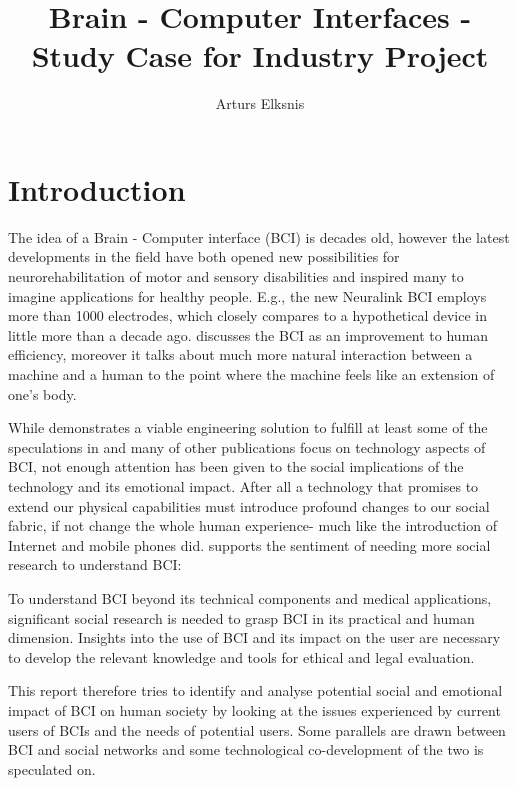 \documentclass[fleqn,11pt]{olplainarticle}
\title{Brain - Computer Interfaces - Study Case for Industry Project}
\author[1]{Arturs Elksnis}
\begin{document}
\flushbottom
\maketitle
\thispagestyle{empty}

\section{Introduction}
The idea of a Brain - Computer interface (BCI) is decades old, however the latest developments in the field have both opened new possibilities for neurorehabilitation of motor and sensory disabilities and inspired many to imagine applications for healthy people. E.g., the new Neuralink BCI \cite{musk2019integrated} employs more than 1000 electrodes, which closely compares to a hypothetical device in \cite{schalk2008brain} little more than a decade ago. \cite{schalk2008brain} discusses the BCI as an improvement to human efficiency, moreover it talks about much more natural interaction between a machine and a human to the point where the machine feels like an extension of one's body.

While \cite{musk2019integrated} demonstrates a viable engineering solution to fulfill at least some of the speculations in \cite{schalk2008brain} and many of other publications focus on technology aspects of BCI, not enough attention has been given to the social implications of the technology and its emotional impact. After all a technology that promises to extend our physical capabilities must introduce profound changes to our social fabric, if not change the whole human experience- much like the introduction of Internet and mobile phones did. \cite{kogel2019using} supports the sentiment of needing more social research 
to understand BCI:
\begin{displayquote}
    To understand BCI beyond its technical components and medical applications, significant social research is needed to grasp BCI in its practical and human dimension. Insights into the use of BCI and its impact on the user are necessary to develop the relevant knowledge and tools for ethical and legal evaluation.
\end{displayquote}

This report therefore tries to identify and analyse potential social and emotional impact of BCI on human society by looking at the issues experienced by current users of BCIs and the needs of potential users. Some parallels are drawn between BCI and social networks and some technological co-development of the two is speculated on.
\end{document}
